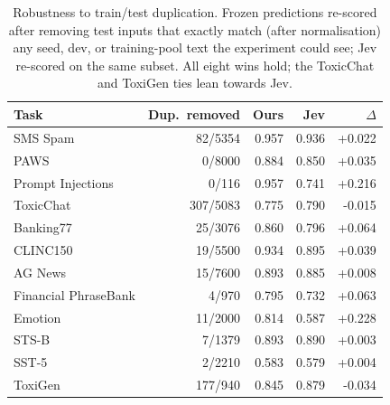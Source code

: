 \begin{table}[t]
\centering\small
\begin{tabular}{lrrrr}
\toprule
Task & Dup.\ removed & Ours & Jev & $\Delta$ \\
\midrule
SMS Spam & 82/5354 & 0.957 & 0.936 & +0.022 \\
PAWS & 0/8000 & 0.884 & 0.850 & +0.035 \\
Prompt Injections & 0/116 & 0.957 & 0.741 & +0.216 \\
ToxicChat & 307/5083 & 0.775 & 0.790 & -0.015 \\
Banking77 & 25/3076 & 0.860 & 0.796 & +0.064 \\
CLINC150 & 19/5500 & 0.934 & 0.895 & +0.039 \\
AG News & 15/7600 & 0.893 & 0.885 & +0.008 \\
Financial PhraseBank & 4/970 & 0.795 & 0.732 & +0.063 \\
Emotion & 11/2000 & 0.814 & 0.587 & +0.228 \\
STS-B & 7/1379 & 0.893 & 0.890 & +0.003 \\
SST-5 & 2/2210 & 0.583 & 0.579 & +0.004 \\
ToxiGen & 177/940 & 0.845 & 0.879 & -0.034 \\
\bottomrule
\end{tabular}
\caption{Robustness to train/test duplication. Frozen predictions re-scored after removing test inputs that exactly match (after normalisation) any seed, dev, or training-pool text the experiment could see; Jev re-scored on the same subset. All eight wins hold; the ToxicChat and ToxiGen ties lean towards Jev.}
\label{tab:dedup}
\end{table}
